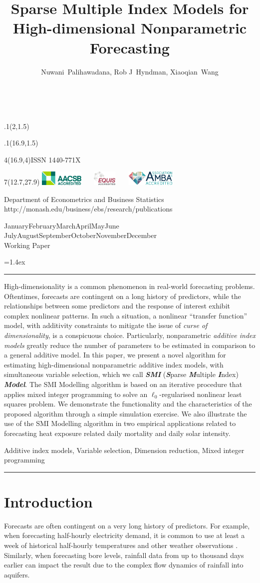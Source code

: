 \documentclass[11pt,a4paper,]{article}
\title{Sparse Multiple Index Models for High-dimensional Nonparametric
Forecasting}
\author{Nuwani~Palihawadana, Rob J~Hyndman, Xiaoqian~Wang}
\date{\sf\Date~\Month~\Year}
\makeatletter
\def\Date{\number\day}
\def\Month{\ifcase\month\or
 January\or February\or March\or April\or May\or June\or
 July\or August\or September\or October\or November\or December\fi}
\def\Year{\number\year}
\def\showjel{{\large\textsf{\textbf{JEL classification:}}~\@jel}}
\def\cover{{\sffamily\setcounter{page}{0}
        \thispagestyle{empty}
        \placefig{2}{1.5}{width=5cm}{_extensions/numbats/wp/monash2}
        \placefig{16.9}{1.5}{width=2.1cm}{_extensions/numbats/wp/MBSportrait}
        \begin{textblock}{4}(16.9,4)ISSN 1440-771X\end{textblock}
        \begin{textblock}{7}(12.7,27.9)\hfill
        \includegraphics[height=0.7cm]{_extensions/numbats/wp/AACSB}~~~
        \includegraphics[height=0.7cm]{_extensions/numbats/wp/EQUIS}~~~
        \includegraphics[height=0.7cm]{_extensions/numbats/wp/AMBA}
        \end{textblock}
        \vspace*{2cm}
        \begin{center}\Large
        Department of Econometrics and Business Statistics\\[.5cm]
        \footnotesize http://monash.edu/business/ebs/research/publications
        \end{center}\vspace{2cm}
        \begin{center}
        \fbox{\parbox{14cm}{\begin{onehalfspace}\centering\Huge\vspace*{0.3cm}
                \textsf{\textbf{\expandafter{\@title}}}\vspace{1cm}\par
                \LARGE\@author\end{onehalfspace}
        }}
        \end{center}
        \vfill
                \begin{center}\Large
                \Month~\Year\\[1cm]
                Working Paper \@wp
        \end{center}\vspace*{2cm}}}
\def\pageone{{\sffamily\setstretch{1}%
        \thispagestyle{empty}%
        \vbox to \textheight{%
        \raggedright\baselineskip=1.2cm
     {\fontsize{24.88}{30}\sffamily\textbf{\expandafter{\@title}}}
        \vspace{2cm}\par
        \hspace{1cm}\parbox{14cm}{\sffamily\large\@addresses}\vspace{1cm}\vfill
        \hspace{1cm}{\large\Date~\Month~\Year}\\[1cm]
        \hspace{1cm}\showjel\vss}}}
\def\blindtitle{{\sffamily
     \thispagestyle{plain}\raggedright\baselineskip=1.2cm
     {\fontsize{24.88}{30}\sffamily\textbf{\expandafter{\@title}}}\vspace{1cm}\par
        }}
\def\titlepage{{\cover\newpage\pageone\newpage\blindtitle}}
\let\maketitle\titlepage
\newenvironment{keywords}{\par\vspace{0.5cm}\noindent{\sffamily\textbf{Keywords:}}}{\vspace{0.25cm}\par\hrule\vspace{0.5cm}\par}
\renewenvironment{abstract}{\begin{minipage}{\textwidth}\parskip=1.4ex\noindent
\hrule\vspace{0.1cm}\par{\sffamily\textbf{\abstractname}}\newline}
  {\end{minipage}}
\def\placefig#1#2#3#4{\begin{textblock}{.1}(#1,#2)\rlap{\texttt{[image: \#4]}}\end{textblock}}
\makeatother
\begin{document}
\maketitle
\begin{abstract}
High-dimensionality is a common phenomenon in real-world forecasting
problems. Oftentimes, forecasts are contingent on a long history of
predictors, while the relationships between some predictors and the
response of interest exhibit complex nonlinear patterns. In such a
situation, a nonlinear ``transfer function'' model, with additivity
constraints to mitigate the issue of \emph{curse of dimensionality}, is
a conspicuous choice. Particularly, nonparametric \emph{additive index
models} greatly reduce the number of parameters to be estimated in
comparison to a general additive model. In this paper, we present a
novel algorithm for estimating high-dimensional nonparametric additive
index models, with simultaneous variable selection, which we call
\textbf{\emph{SMI}} (\textbf{\emph{S}}parse \textbf{\emph{M}}ultiple
\textbf{\emph{I}}ndex) \textbf{\emph{Model}}. The SMI Modelling
algorithm is based on an iterative procedure that applies mixed integer
programming to solve an \(\ell_{0}\)-regularised nonlinear least squares
problem. We demonstrate the functionality and the characteristics of the
proposed algorithm through a simple simulation exercise. We also
illustrate the use of the SMI Modelling algorithm in two empirical
applications related to forecasting heat exposure related daily
mortality and daily solar intensity.
\end{abstract}
\begin{keywords}
Additive index models, Variable selection, Dimension reduction, Mixed
integer programming
\end{keywords}

\ifdefined\Shaded\renewenvironment{Shaded}{\begin{tcolorbox}[breakable, frame hidden, boxrule=0pt, enhanced, sharp corners, borderline west={3pt}{0pt}{shadecolor}, interior hidden]}{\end{tcolorbox}}\fi

\hypertarget{sec-introduction}{%
\section{Introduction}\label{sec-introduction}}

Forecasts are often contingent on a very long history of predictors. For
example, when forecasting half-hourly electricity demand, it is common
to use at least a week of historical half-hourly temperatures and other
weather observations \autocite{HF2010}. Similarly, when forecasting bore
levels, rainfall data from up to thousand days earlier can impact the
result \autocite{Bakker2019} due to the complex flow dynamics of
rainfall into aquifers.
\end{document}
